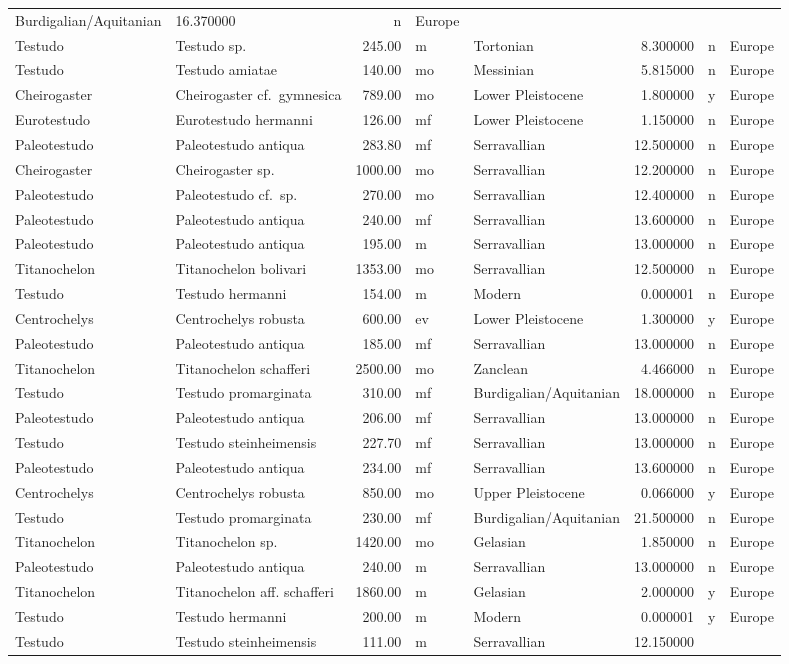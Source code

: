 \begin{landscape}
\begin{longtable}[]{@{}llrllrll@{}}
	Burdigalian/Aquitanian & 16.370000 & n & Europe\tabularnewline
	Testudo & Testudo sp. & 245.00 & m & Tortonian & 8.300000 & n &
	Europe\tabularnewline
	Testudo & Testudo amiatae & 140.00 & mo & Messinian & 5.815000 & n &
	Europe\tabularnewline
	Cheirogaster & Cheirogaster cf.~gymnesica & 789.00 & mo & Lower
	Pleistocene & 1.800000 & y & Europe\tabularnewline
	Eurotestudo & Eurotestudo hermanni & 126.00 & mf & Lower Pleistocene &
	1.150000 & n & Europe\tabularnewline
	Paleotestudo & Paleotestudo antiqua & 283.80 & mf & Serravallian &
	12.500000 & n & Europe\tabularnewline
	Cheirogaster & Cheirogaster sp. & 1000.00 & mo & Serravallian &
	12.200000 & n & Europe\tabularnewline
	Paleotestudo & Paleotestudo cf.~sp. & 270.00 & mo & Serravallian &
	12.400000 & n & Europe\tabularnewline
	Paleotestudo & Paleotestudo antiqua & 240.00 & mf & Serravallian &
	13.600000 & n & Europe\tabularnewline
	Paleotestudo & Paleotestudo antiqua & 195.00 & m & Serravallian &
	13.000000 & n & Europe\tabularnewline
	Titanochelon & Titanochelon bolivari & 1353.00 & mo & Serravallian &
	12.500000 & n & Europe\tabularnewline
	Testudo & Testudo hermanni & 154.00 & m & Modern & 0.000001 & n &
	Europe\tabularnewline
	Centrochelys & Centrochelys robusta & 600.00 & ev & Lower Pleistocene &
	1.300000 & y & Europe\tabularnewline
	Paleotestudo & Paleotestudo antiqua & 185.00 & mf & Serravallian &
	13.000000 & n & Europe\tabularnewline
	Titanochelon & Titanochelon schafferi & 2500.00 & mo & Zanclean &
	4.466000 & n & Europe\tabularnewline
	Testudo & Testudo promarginata & 310.00 & mf & Burdigalian/Aquitanian &
	18.000000 & n & Europe\tabularnewline
	Paleotestudo & Paleotestudo antiqua & 206.00 & mf & Serravallian &
	13.000000 & n & Europe\tabularnewline
	Testudo & Testudo steinheimensis & 227.70 & mf & Serravallian &
	13.000000 & n & Europe\tabularnewline
	Paleotestudo & Paleotestudo antiqua & 234.00 & mf & Serravallian &
	13.600000 & n & Europe\tabularnewline
	Centrochelys & Centrochelys robusta & 850.00 & mo & Upper Pleistocene &
	0.066000 & y & Europe\tabularnewline
	Testudo & Testudo promarginata & 230.00 & mf & Burdigalian/Aquitanian &
	21.500000 & n & Europe\tabularnewline
	Titanochelon & Titanochelon sp. & 1420.00 & mo & Gelasian & 1.850000 & n
	& Europe\tabularnewline
	Paleotestudo & Paleotestudo antiqua & 240.00 & m & Serravallian &
	13.000000 & n & Europe\tabularnewline
	Titanochelon & Titanochelon aff. schafferi & 1860.00 & m & Gelasian &
	2.000000 & y & Europe\tabularnewline
	Testudo & Testudo hermanni & 200.00 & m & Modern & 0.000001 & y &
	Europe\tabularnewline
	Testudo & Testudo steinheimensis & 111.00 & m & Serravallian & 12.150000

\end{longtable}
\end{landscape}

